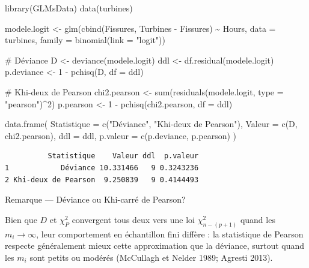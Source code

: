 \documentclass[
  french,
  letterpaper,
  DIV=11,
  numbers=noendperiod]{scrreprt}
\newenvironment{Shaded}{\begin{snugshade}}{\end{snugshade}}
\newcommand{\AttributeTok}[1]{\textcolor[rgb]{0.40,0.45,0.13}{#1}}
\newcommand{\CommentTok}[1]{\textcolor[rgb]{0.37,0.37,0.37}{#1}}
\newcommand{\DecValTok}[1]{\textcolor[rgb]{0.68,0.00,0.00}{#1}}
\newcommand{\FunctionTok}[1]{\textcolor[rgb]{0.28,0.35,0.67}{#1}}
\newcommand{\NormalTok}[1]{\textcolor[rgb]{0.00,0.23,0.31}{#1}}
\newcommand{\OtherTok}[1]{\textcolor[rgb]{0.00,0.23,0.31}{#1}}
\newcommand{\SpecialCharTok}[1]{\textcolor[rgb]{0.37,0.37,0.37}{#1}}
\newcommand{\StringTok}[1]{\textcolor[rgb]{0.13,0.47,0.30}{#1}}
\begin{document}
\begin{Shaded}
\begin{Highlighting}[]
\FunctionTok{library}\NormalTok{(GLMsData)}
\FunctionTok{data}\NormalTok{(turbines)}

\NormalTok{modele.logit }\OtherTok{\textless{}{-}} \FunctionTok{glm}\NormalTok{(}\FunctionTok{cbind}\NormalTok{(Fissures, Turbines }\SpecialCharTok{{-}}\NormalTok{ Fissures) }\SpecialCharTok{\textasciitilde{}}\NormalTok{ Hours,}
                     \AttributeTok{data =}\NormalTok{ turbines, }\AttributeTok{family =} \FunctionTok{binomial}\NormalTok{(}\AttributeTok{link =} \StringTok{"logit"}\NormalTok{))}

\CommentTok{\# Déviance}
\NormalTok{D }\OtherTok{\textless{}{-}} \FunctionTok{deviance}\NormalTok{(modele.logit)}
\NormalTok{ddl }\OtherTok{\textless{}{-}} \FunctionTok{df.residual}\NormalTok{(modele.logit)}
\NormalTok{p.deviance }\OtherTok{\textless{}{-}} \DecValTok{1} \SpecialCharTok{{-}} \FunctionTok{pchisq}\NormalTok{(D, }\AttributeTok{df =}\NormalTok{ ddl)}

\CommentTok{\# Khi{-}deux de Pearson}
\NormalTok{chi2.pearson }\OtherTok{\textless{}{-}} \FunctionTok{sum}\NormalTok{(}\FunctionTok{residuals}\NormalTok{(modele.logit, }\AttributeTok{type =} \StringTok{"pearson"}\NormalTok{)}\SpecialCharTok{\^{}}\DecValTok{2}\NormalTok{)}
\NormalTok{p.pearson }\OtherTok{\textless{}{-}} \DecValTok{1} \SpecialCharTok{{-}} \FunctionTok{pchisq}\NormalTok{(chi2.pearson, }\AttributeTok{df =}\NormalTok{ ddl)}

\FunctionTok{data.frame}\NormalTok{(}
  \AttributeTok{Statistique =} \FunctionTok{c}\NormalTok{(}\StringTok{"Déviance"}\NormalTok{, }\StringTok{"Khi{-}deux de Pearson"}\NormalTok{),}
  \AttributeTok{Valeur =} \FunctionTok{c}\NormalTok{(D, chi2.pearson),}
  \AttributeTok{ddl =}\NormalTok{ ddl,}
  \AttributeTok{p.valeur =} \FunctionTok{c}\NormalTok{(p.deviance, p.pearson)}
\NormalTok{)}
\end{Highlighting}
\end{Shaded}

\begin{verbatim}
          Statistique    Valeur ddl  p.valeur
1            Déviance 10.331466   9 0.3243236
2 Khi-deux de Pearson  9.250839   9 0.4144493
\end{verbatim}

{Remarque --- Déviance ou Khi-carré de Pearson?}

Bien que \(D\) et \(\chi^2_P\) convergent tous deux vers une loi
\(\chi^2_{n-(p+1)}\) quand les \(m_i \to \infty\), leur comportement en
échantillon fini diffère : la statistique de Pearson respecte
généralement mieux cette approximation que la déviance, surtout quand
les \(m_i\) sont petits ou modérés (McCullagh et Nelder 1989; Agresti
2013).
\end{document}
